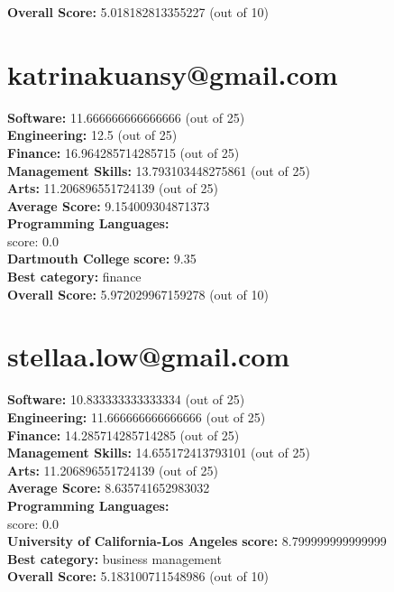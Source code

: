 \documentclass{article}
\begin{document}
\textbf{Overall Score: }5.018182813355227 (out of 10)\section{katrinakuansy@gmail.com}
\textbf{Software:} 11.666666666666666 (out of 25)\\
\textbf{Engineering: } 12.5 (out of 25)\\
\textbf{Finance:} 16.964285714285715 (out of 25)\\
\textbf{Management Skills:} 13.793103448275861 (out of 25)\\
\textbf{Arts:} 11.206896551724139 (out of 25)\\
\textbf{Average Score: } 9.154009304871373\\
\textbf{Programming Languages:} \\
score: 0.0\\
\textbf{Dartmouth College} \textbf{score:} 9.35\\
\textbf{Best category: } finance\\
\textbf{Overall Score: }5.972029967159278 (out of 10)\section{stellaa.low@gmail.com}
\textbf{Software:} 10.833333333333334 (out of 25)\\
\textbf{Engineering: } 11.666666666666666 (out of 25)\\
\textbf{Finance:} 14.285714285714285 (out of 25)\\
\textbf{Management Skills:} 14.655172413793101 (out of 25)\\
\textbf{Arts:} 11.206896551724139 (out of 25)\\
\textbf{Average Score: } 8.635741652983032\\
\textbf{Programming Languages:} \\
score: 0.0\\
\textbf{University of California-Los Angeles} \textbf{score:} 8.799999999999999\\
\textbf{Best category: } business management\\
\textbf{Overall Score: }5.183100711548986 (out of 10)
\end{document}
